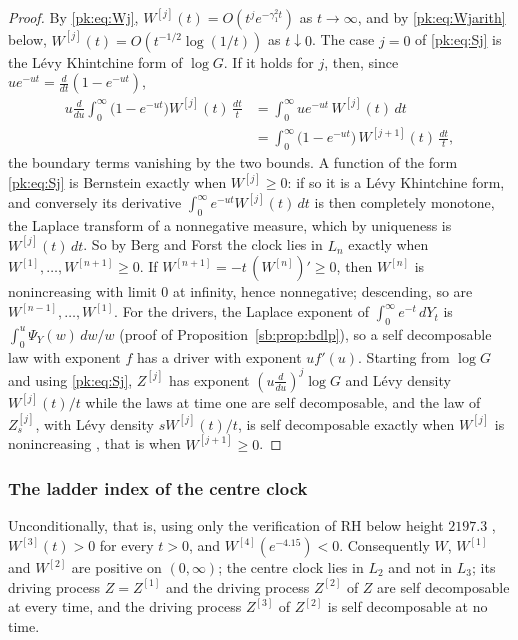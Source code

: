 \begin{proof}
By \eqref{pk:eq:Wj}, $W^{[j]}(t)=O(t^je^{-\gamma_1^2t})$ as $t\to\infty$, and by \eqref{pk:eq:Wjarith} below, $W^{[j]}(t)=O(t^{-1/2}\log(1/t))$ as $t\downarrow0$. The case $j=0$ of \eqref{pk:eq:Sj} is the L\'evy Khintchine form of $\log G$. If it holds for $j$, then, since $ue^{-ut}=\frac d{dt}(1-e^{-ut})$,
\[
\begin{aligned}
u\frac d{du}\int_0^\infty\big(1-e^{-ut}\big)W^{[j]}(t)\,\frac{dt}t&=\int_0^\infty ue^{-ut}\,W^{[j]}(t)\,dt\\
&=\int_0^\infty\big(1-e^{-ut}\big)\,W^{[j+1]}(t)\,\frac{dt}t ,
\end{aligned}
\]
the boundary terms vanishing by the two bounds. A function of the form \eqref{pk:eq:Sj} is Bernstein exactly when $W^{[j]}\ge0$: if so it is a L\'evy Khintchine form, and conversely its derivative $\int_0^\infty e^{-ut}W^{[j]}(t)\,dt$ is then completely monotone, the Laplace transform of a nonnegative measure, which by uniqueness is $W^{[j]}(t)\,dt$. So by Berg and Forst the clock lies in $L_n$ exactly when $W^{[1]},\dots,W^{[n+1]}\ge0$. If $W^{[n+1]}=-t\,(W^{[n]})'\ge0$, then $W^{[n]}$ is nonincreasing with limit $0$ at infinity, hence nonnegative; descending, so are $W^{[n-1]},\dots,W^{[1]}$. For the drivers, the Laplace exponent of $\int_0^\infty e^{-t}\,dY_t$ is $\int_0^u\Psi_Y(w)\,dw/w$ (proof of Proposition~\ref{sb:prop:bdlp}), so a self decomposable law with exponent $f$ has a driver with exponent $uf'(u)$. Starting from $\log G$ and using \eqref{pk:eq:Sj}, $Z^{[j]}$ has exponent $(u\frac d{du})^j\log G$ and L\'evy density $W^{[j]}(t)/t$ while the laws at time one are self decomposable, and the law of $Z^{[j]}_s$, with L\'evy density $sW^{[j]}(t)/t$, is self decomposable exactly when $W^{[j]}$ is nonincreasing \cite[Corollary 15.11]{Sato99}, that is when $W^{[j+1]}\ge0$.
\end{proof}

\subsubsection{The ladder index of the centre clock}\label{pk:sec:index}

\begin{theorem}\label{pk:thm:ladder}
Unconditionally, that is, using only the verification of RH below height $2197.3$ \cite{PT21}, $W^{[3]}(t)>0$ for every $t>0$, and $W^{[4]}(e^{-4.15})<0$. Consequently $W$, $W^{[1]}$ and $W^{[2]}$ are positive on $(0,\infty)$; the centre clock lies in $L_2$ and not in $L_3$; its driving process $Z=Z^{[1]}$ and the driving process $Z^{[2]}$ of $Z$ are self decomposable at every time, and the driving process $Z^{[3]}$ of $Z^{[2]}$ is self decomposable at no time.
\end{theorem}

